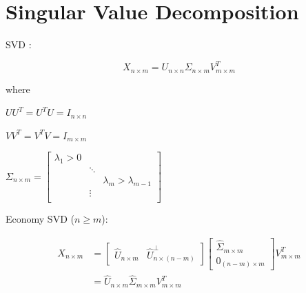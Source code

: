\documentclass{article}
\begin{document}
\section{Singular Value Decomposition}
\begin{definition}
    SVD \cite{BRUNTON_2022_DATA_DRIVEN_SCIENCE_AND_ENGINEERING_MACHINE_LEARNING_DYNAMICAL_SYSTEMS_AND_CONTROL}:

    \begin{equation}
        \label{eq:svd}
        X_{n \times m} = U_{n \times n}\Sigma_{n \times m}V_{m \times m}^{T}
    \end{equation}

    where

    $UU^{T} = U^{T}U = I_{n \times n}$

    $VV^{T} = V^{T}V = I_{m \times m}$

    $\Sigma_{n \times m} = \begin{bmatrix} \lambda_{1}>0 & & \\ & \ddots & \\ & & \lambda_{m}>\lambda_{m-1} \\ & \vdots & \\ \end{bmatrix}$
\end{definition}

\begin{definition}
    Economy SVD ($n \geq m$):

    \begin{equation}
        \label{eq:economy-svd}
        \begin{aligned}
            X_{n \times m} & = \begin{bmatrix}\hat{U}_{n \times m} & \hat{U}_{n \times (n-m)}^{\perp}\end{bmatrix}
            \begin{bmatrix}\hat{\Sigma}_{m \times m} \\ 0_{(n-m) \times m}\end{bmatrix}
            V_{m \times m}^{T}                                                                                     \\
                           & = \hat{U}_{n \times m} \hat{\Sigma}_{m \times m} V_{m \times m}^{T}
        \end{aligned}
    \end{equation}
\end{definition}
\end{document}
